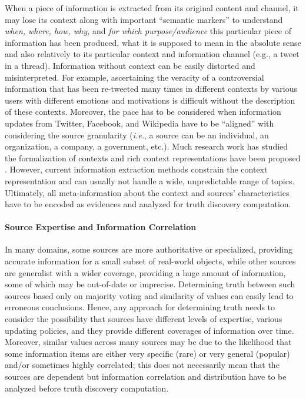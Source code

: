 \documentclass[prodmode,acmtecs]{acmsmall} %
\begin{document}
When a piece of information  is extracted from its original 
content and channel, it may lose its context along with important 
``semantic markers'' to understand {\it when, where, how, why,} and
{\it for which purpose/audience} this particular piece of information 
has been produced, what it is supposed to mean in the absolute sense and
also relatively to its particular context and  information channel (e.g., a tweet in a thread).
Information without context can be easily distorted and misinterpreted. For example, ascertaining
the veracity of a controversial information that has been re-tweeted many times in different contexts
by various users with different emotions and motivations is difficult without the description of these
contexts. Moreover, the pace has to be considered when information  updates from Twitter, Facebook, and 
Wikipedia have to be ``aligned'' with considering the source granularity ({\it i.e.}, a source can be an
individual, an organization, a company, a government, etc.). Much research work has studied the formalization 
of contexts and rich context representations have been proposed \cite{eps270829}. However, current information 
extraction  methods constrain the context representation and can usually not handle a wide, unpredictable 
range of topics. Ultimately, all meta-information about the context and sources' characteristics have to be encoded 
as evidences and analyzed for truth discovery computation.

\paragraph*{Source Expertise and Information Correlation} 

In many domains, some sources are more authoritative or specialized, providing
accurate information for a small subset of real-world objects, while other
sources are generalist with a wider coverage, providing a huge amount of information,
some of which may be out-of-date or imprecise. Determining truth between such sources
based only on majority voting and similarity of values can easily lead to erroneous conclusions.
Hence, any approach for determining truth needs to consider the possibility that sources have different 
levels of expertise, various updating policies, and they provide different coverages of information over time.
Moreover, similar values across many sources may be due to the likelihood that some information items are either
very specific (rare) or very general (popular) and/or sometimes highly correlated; this does not necessarily mean
that the sources are dependent but information correlation and distribution have to be analyzed before truth discovery
computation.
\end{document}
